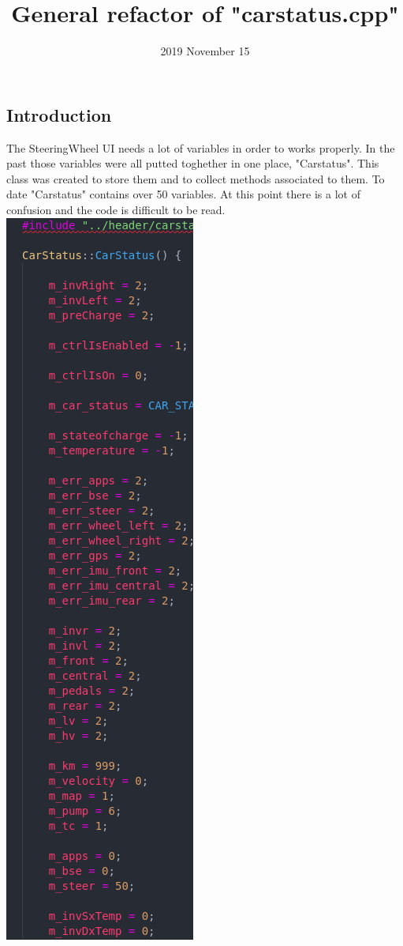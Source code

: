 \documentclass[12pt, letterpaper]{article}
\title{General refactor of "carstatus.cpp"}
\date{2019 November 15}
\begin{document}
\begin{titlepage}
\maketitle
\end{titlepage}

\begin{flushleft}

\section{Introduction}
	The SteeringWheel UI needs a lot of variables in order to works properly. In the past those variables were all putted toghether in one place, "Carstatus". This class was created to store them and to collect methods associated to them. To date "Carstatus" contains over 50 variables. At this point there is a lot of confusion and the code is difficult to be read.
\newline
\newline
\includegraphics[scale=1.5]{code.png}

\end{flushleft}
\end{document}
